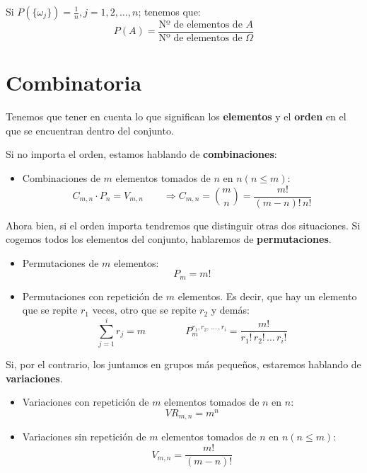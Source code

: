 \documentclass[a4paper]{book}
\numberwithin{figure}{section}
\numberwithin{equation}{subsection}
\numberwithin{figure}{chapter}
\theoremstyle{definition}
\begin{document}
Si $P(\{ \omega _j\} ) = \frac{1}{n}, j=1,2,\ldots ,n$; tenemos que:
\[\boxed{P(A) = \frac{\text{Nº de elementos de }A}{\text{Nº de elementos de }\Omega}}\]

\section{Combinatoria}

Tenemos que tener en cuenta lo que significan los \textbf{elementos} y el \textbf{orden} en el que se encuentran dentro del conjunto.

Si no importa el orden, estamos hablando de \textbf{combinaciones}:
\begin{itemize}
	\item Combinaciones de $m$ elementos tomados de $n$ en $n (n\leq m)$: \[C_{m,n}\cdot P_n = V_{m,n} \qquad \Rightarrow C_{m,n} = {\binom{m}{n}} = \frac{m!}{\left( m-n \right)! \, n!}\]
\end{itemize}

Ahora bien, si el orden importa tendremos que distinguir otras dos situaciones. Si cogemos todos los elementos del conjunto, hablaremos de \textbf{permutaciones}.
\begin{itemize}
	\item Permutaciones de $m$ elementos: \[P_m = m!\]
	\item Permutaciones con repetición de $m$ elementos. Es decir, que hay un elemento que se repite $r_1$ veces, otro que se repite $r_2$ y demás: \[\sum^{i}_{j=1}{r_j}=m \qquad \qquad P^{r_1,r_2,\, \ldots\,  , r_i}_m=\frac{m!}{r_1!\, r_2!\, \ldots \, r_i!}\]
\end{itemize}

Si, por el contrario, los juntamos en grupos más pequeños, estaremos hablando de \textbf{variaciones}.

\begin{itemize}
	\item Variaciones con repetición de $m$ elementos tomados de $n$ en $n$: \[VR_{m,n}=m^n\]
	\item Variaciones sin repetición de $m$ elementos tomados de $n$ en $n (n\leq m)$: \[V_{m,n}=\frac{m!}{\left( m-n \right)!} \]
\end{itemize}
\end{document}
